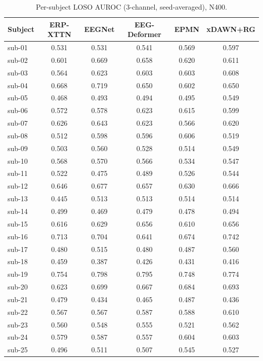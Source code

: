 \begin{table}[t]
\centering
\scriptsize
\caption{Per-subject LOSO AUROC (3-channel, seed-averaged), N400.}
\label{tab:persubj-n400}
\begin{tabular}{lccccc}
\toprule
Subject & ERP-XTTN & EEGNet & EEG-Deformer & EPMN & xDAWN+RG \\
\midrule
sub-01 & 0.531 & 0.531 & 0.541 & 0.569 & 0.597 \\
sub-02 & 0.601 & 0.669 & 0.658 & 0.620 & 0.611 \\
sub-03 & 0.564 & 0.623 & 0.603 & 0.603 & 0.608 \\
sub-04 & 0.668 & 0.719 & 0.650 & 0.602 & 0.650 \\
sub-05 & 0.468 & 0.493 & 0.494 & 0.495 & 0.549 \\
sub-06 & 0.572 & 0.578 & 0.623 & 0.615 & 0.599 \\
sub-07 & 0.626 & 0.643 & 0.623 & 0.566 & 0.620 \\
sub-08 & 0.512 & 0.598 & 0.596 & 0.606 & 0.519 \\
sub-09 & 0.503 & 0.560 & 0.528 & 0.514 & 0.549 \\
sub-10 & 0.568 & 0.570 & 0.566 & 0.534 & 0.547 \\
sub-11 & 0.522 & 0.475 & 0.489 & 0.526 & 0.544 \\
sub-12 & 0.646 & 0.677 & 0.657 & 0.630 & 0.666 \\
sub-13 & 0.445 & 0.513 & 0.513 & 0.514 & 0.514 \\
sub-14 & 0.499 & 0.469 & 0.479 & 0.478 & 0.494 \\
sub-15 & 0.616 & 0.629 & 0.656 & 0.610 & 0.656 \\
sub-16 & 0.713 & 0.704 & 0.641 & 0.674 & 0.742 \\
sub-17 & 0.480 & 0.515 & 0.480 & 0.487 & 0.560 \\
sub-18 & 0.459 & 0.387 & 0.426 & 0.431 & 0.416 \\
sub-19 & 0.754 & 0.798 & 0.795 & 0.748 & 0.774 \\
sub-20 & 0.623 & 0.699 & 0.667 & 0.684 & 0.693 \\
sub-21 & 0.479 & 0.434 & 0.465 & 0.487 & 0.436 \\
sub-22 & 0.567 & 0.567 & 0.587 & 0.588 & 0.610 \\
sub-23 & 0.560 & 0.548 & 0.555 & 0.521 & 0.562 \\
sub-24 & 0.579 & 0.587 & 0.557 & 0.604 & 0.603 \\
sub-25 & 0.496 & 0.511 & 0.507 & 0.545 & 0.527 \\

\end{tabular}
\end{table}
